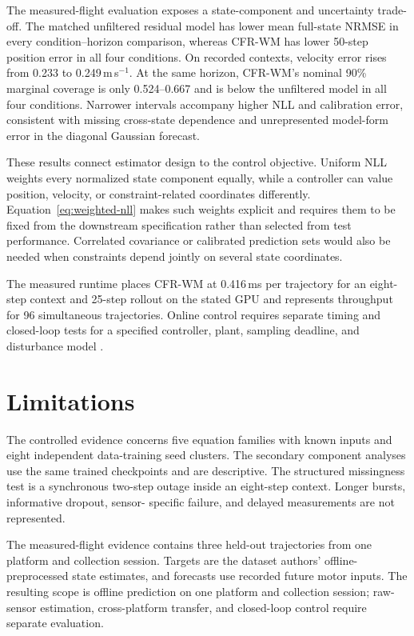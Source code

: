 \documentclass[iicol,pdflatex,sn-basic,Numbered]{sn-jnl}
\newcommand{\ExternalCFRRecordedLongVelocityMean}{0.249}
\newcommand{\ExternalUnfilteredRecordedLongVelocityMean}{0.233}
\newcommand{\CFRLatencyMean}{0.416}
\begin{document}
The measured-flight evaluation exposes a state-component and uncertainty
trade-off. The matched unfiltered residual model has lower mean full-state
NRMSE in every condition--horizon comparison, whereas CFR-WM has lower 50-step
position error in all four conditions. On recorded contexts, velocity error
rises from \ExternalUnfilteredRecordedLongVelocityMean{} to
\ExternalCFRRecordedLongVelocityMean{}\,m\,s$^{-1}$. At the same horizon,
CFR-WM's nominal 90\% marginal coverage is only 0.524--0.667 and is below the
unfiltered model in all four conditions. Narrower intervals accompany higher
NLL and calibration error, consistent with missing cross-state dependence and
unrepresented model-form error in the diagonal Gaussian forecast.

These results connect estimator design to the control objective. Uniform NLL
weights every normalized state component equally, while a controller can value
position, velocity, or constraint-related coordinates differently.
Equation~\eqref{eq:weighted-nll} makes such weights explicit and requires them
to be fixed from the downstream specification rather than selected from test
performance. Correlated covariance or calibrated prediction sets would also be
needed when constraints depend jointly on several state coordinates.

The measured runtime places CFR-WM at
\CFRLatencyMean{}\,ms per trajectory for an eight-step context and 25-step
rollout on the stated GPU and represents throughput for 96 simultaneous
trajectories. Online control requires separate timing and closed-loop tests for
a specified controller, plant, sampling deadline, and disturbance model
\cite{hewing2020_learning_mpc}.

\section{Limitations}

The controlled evidence concerns five equation families with known inputs and
eight independent data-training seed clusters. The secondary component analyses
use the same trained checkpoints and are descriptive. The structured
missingness test is a synchronous two-step
outage inside an eight-step context. Longer bursts, informative dropout, sensor-
specific failure, and delayed measurements are not represented.

The measured-flight evidence contains three held-out trajectories from one
platform and collection session. Targets are the dataset authors'
offline-preprocessed state estimates, and forecasts use recorded future motor
inputs. The resulting scope is offline prediction on one platform and
collection session; raw-sensor estimation, cross-platform transfer, and
closed-loop control require separate evaluation.
\end{document}
